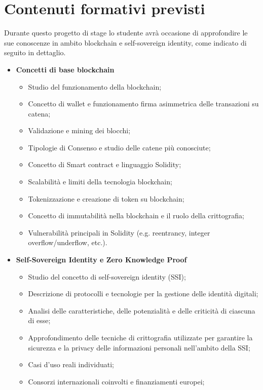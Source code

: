 \section*{Contenuti formativi previsti}
Durante questo progetto di stage lo studente avrà occasione di approfondire le sue conoscenze in ambito blockchain e self-sovereign identity,
come indicato di seguito in dettaglio.
\begin{itemize}
    \item \textbf{Concetti di base blockchain}
    \begin{itemize}
        \item Studio del funzionamento della blockchain;
        \item Concetto di wallet e funzionamento firma asimmetrica delle transazioni su catena;
        \item Validazione e mining dei blocchi;
        \newpage
        \item Tipologie di Consenso e studio delle catene più conosciute;
        \item Concetto di Smart contract e linguaggio Solidity;
        \item Scalabilità e limiti della tecnologia blockchain;
        \item Tokenizzazione e creazione di token su blockchain;
        \item Concetto di immutabilità nella blockchain e il ruolo della crittografia;
        \item Vulnerabilità principali in Solidity (e.g. reentrancy, integer overflow/underflow, etc.).
    \end{itemize}
    \item \textbf{Self-Sovereign Identity e Zero Knowledge Proof}
    \begin{itemize}
        \item Studio del concetto di self-sovereign identity (SSI);
        \item Descrizione di protocolli e tecnologie per la gestione delle identità digitali;
        \item Analisi delle caratteristiche, delle potenzialità e delle criticità di ciascuna di esse;
        \item Approfondimento delle tecniche di crittografia utilizzate per garantire la sicurezza e la privacy delle informazioni personali nell'ambito della SSI;
        \item Casi d'uso reali individuati;
        \item Consorzi internazionali coinvolti e finanziamenti europei;

\end{itemize}
\end{itemize}
